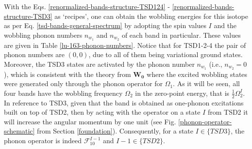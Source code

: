 With the Eqs. \ref{renormalized-bands-structure-TSD124} - \ref{renormalized-bands-structure-TSD3} as `recipes', one can obtain the wobbling energies for this isotope as per Eq. \ref{tsd-bands-general-spectrum} by adopting the spin values $I$ and the wobbling phonon numbers $n_{w_1}$ and $n_{w_2}$ of each band in particular. These values are given in Table \ref{lu-163-phonon-numbers}. Notice that for TSD1-2-4 the pair of phonon numbers are $(0,0)$, due to all of them being variational ground states. Moreover, the TSD3 states are activated by the phonon number $n_{w_1}$ (i.e., $n_{w_2}=0$), which is consistent with the theory from $\mathbf{W_0}$ where the excited wobbling states were generated only through the phonon operator for $\Omega_1$. As it will be seen, all four bands have the wobbling frequency $\Omega_2$ in the zero-point energy, that is $\frac{1}{2}\Omega_2^I$. In reference to TSD3, given that the band is obtained as one-phonon excitations built on top of TSD2, then by acting with the operator on a state $I$ from TSD2 it will increase the angular momentum by one unit (see Fig. \ref{phonon-operator-schematic} from Section \ref{foundation}). Consequently, for a state $I\in\{TSD3\}$, the phonon operator is indeed $\mathcal{F}_{10}^{I-1}$ and $I-1\in\{TSD2\}$.
\begin{table}
    \centering
    \caption{The wobbling phonon numbers of $^{163}$Lu that correspond to the phonon frequencies $\Omega_1$ and $\Omega_2$, respectively (see Eq. \ref{phononic-term-tsd-energies}). For completeness the first ($I_0$) and last (i.e., $I_t$ for \emph{terminus}) spin states of each band are given. The quasi-particles involved in the particle + rotor coupling are denoted according to Eqs. \ref{renormalized-bands-structure-TSD124} - \ref{renormalized-bands-structure-TSD3}. See text for the $\mathcal{F}_{10}^{I-1}$ term.}
    \label{lu-163-phonon-numbers}
\end{table}

